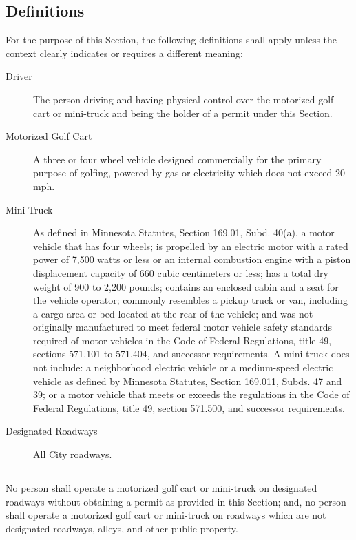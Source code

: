 \subsection{Definitions}
For the purpose of this Section, the following definitions shall apply unless the context clearly indicates or requires a different meaning:
\begin{description}
    \item[Driver] The person driving and having physical control over the motorized golf cart or mini-truck and being the holder of a permit under this Section.
    \item[Motorized Golf Cart] A three or four wheel vehicle designed commercially for the primary purpose of golfing, powered by gas or electricity which does not exceed 20 mph.
    \item[Mini-Truck] As defined in Minnesota Statutes, Section 169.01, Subd. 40(a), a motor vehicle that has four wheels; is propelled by an electric motor with a rated power of 7,500 watts or less or an internal combustion engine with a piston displacement capacity of 660 cubic centimeters or less; has a total dry weight of 900 to 2,200 pounds; contains an enclosed cabin and a seat for the vehicle operator; commonly resembles a pickup truck or van, including a cargo area or bed located at the rear of the vehicle; and was not originally manufactured to meet federal motor vehicle safety standards required of motor vehicles in the Code of Federal Regulations, title 49, sections 571.101 to 571.404, and successor requirements.  A mini-truck does not include:  a neighborhood electric vehicle or a medium-speed electric vehicle as defined by Minnesota Statutes, Section 169.011, Subds. 47 and 39; or a motor vehicle that meets or exceeds the regulations in the Code of Federal Regulations, title 49, section 571.500, and successor requirements.
    \item[Designated Roadways] All City roadways.
\end{description}
\subsection{}
No person shall operate a motorized golf cart or mini-truck on designated roadways without obtaining a permit as provided in this Section; and, no person shall operate a motorized golf cart or mini-truck on roadways which are not designated roadways, alleys, and other public property.
